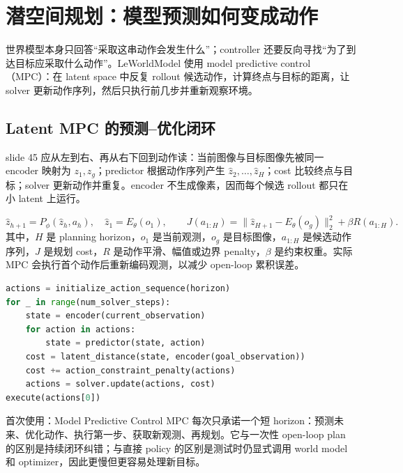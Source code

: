 \section{潜空间规划：模型预测如何变成动作}

世界模型本身只回答``采取这串动作会发生什么''；controller 还要反向寻找``为了到达目标应采取什么动作''。LeWorldModel 使用 model predictive control（MPC）：在 latent space 中反复 rollout 候选动作，计算终点与目标的距离，让 solver 更新动作序列，然后只执行前几步并重新观察环境。

\subsection{Latent MPC 的预测--优化闭环}

slide 45 应从左到右、再从右下回到动作读：当前图像与目标图像先被同一 encoder 映射为 $z_1,z_g$；predictor 根据动作序列产生 $\hat z_2,\ldots,\hat z_H$；cost 比较终点与目标；solver 更新动作并重复。encoder 不生成像素，因而每个候选 rollout 都只在小 latent 上运行。


\[
\hat z_{h+1}=P_\phi(\hat z_h,a_h),\quad \hat z_1=E_\theta(o_1),
\qquad
J(a_{1:H})=\|\hat z_{H+1}-E_\theta(o_g)\|_2^2+\beta R(a_{1:H}).
\]
其中，$H$ 是 planning horizon，$o_1$ 是当前观测，$o_g$ 是目标图像，$a_{1:H}$ 是候选动作序列，$J$ 是规划 cost，$R$ 是动作平滑、幅值或边界 penalty，$\beta$ 是约束权重。实际 MPC 会执行首个动作后重新编码观测，以减少 open-loop 累积误差。

\begin{lstlisting}[language=Python,caption={Latent MPC 的最小预测--优化循环}]
actions = initialize_action_sequence(horizon)
for _ in range(num_solver_steps):
    state = encoder(current_observation)
    for action in actions:
        state = predictor(state, action)
    cost = latent_distance(state, encoder(goal_observation))
    cost += action_constraint_penalty(actions)
    actions = solver.update(actions, cost)
execute(actions[0])
\end{lstlisting}


\begin{knowledgebox}{首次使用：Model Predictive Control}
MPC 每次只承诺一个短 horizon：预测未来、优化动作、执行第一步、获取新观测、再规划。它与一次性 open-loop plan 的区别是持续闭环纠错；与直接 policy 的区别是测试时仍显式调用 world model 和 optimizer，因此更慢但更容易处理新目标。
\end{knowledgebox}


